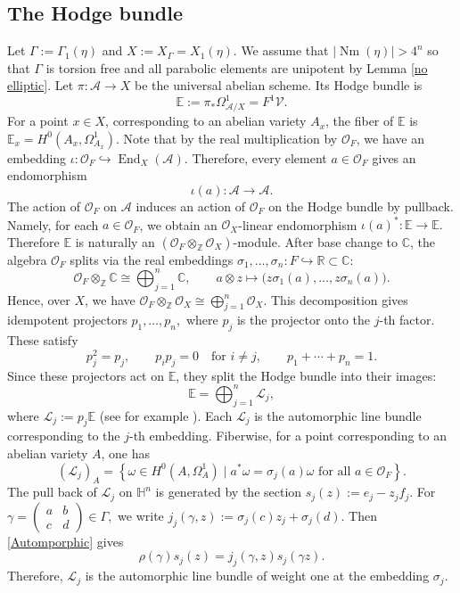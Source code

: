 \documentclass[12 pt]{amsart}
\theoremstyle{definition}
\newcommand{\Nm}{\operatorname{Nm}}
\begin{document}
\subsection{The Hodge bundle} Let $\Gamma:=\Gamma_1(\eta)$ and $X:=X_\Gamma=X_1(\eta)$. We assume that $|\Nm(\eta)|>4^n$ so that $\Gamma$ is torsion free and all parabolic elements are unipotent by Lemma \ref{no elliptic}.  Let $\pi:\mathcal A\to X$ be the universal abelian scheme. Its Hodge bundle is
\begin{equation*}
\mathbb E:=\pi_*\Omega^1_{\mathcal A/X}=F^1\mathcal V.
\end{equation*}
For a point \(x\in X\), corresponding to an abelian variety \(A_x\), the fiber
of \(\mathbb E\) is
\(
\mathbb E_x=H^0(A_x,\Omega^1_{A_x}).
\)
 Note that by the real multiplication by \(\mathcal O_F\), we have an embedding
\(
\iota:\mathcal O_F\hookrightarrow \operatorname{End}_X(\mathcal A).
\)
Therefore, every element \(a\in \mathcal O_F\) gives an endomorphism
\[
\iota(a):\mathcal A\longrightarrow \mathcal A.
\]
The action of \(\mathcal O_F\) on \(\mathcal A\) induces an action of
\(\mathcal O_F\) on the Hodge bundle by pullback. Namely, for each
\(a\in\mathcal O_F\), we obtain an \(\mathcal O_X\)-linear endomorphism
\(
\iota(a)^*:\mathbb E\longrightarrow \mathbb E.
\)
Therefore \(\mathbb E\) is naturally an
\((\mathcal O_F\otimes_{\mathbb Z}\mathcal O_X)\)-module. After base change to
\(\mathbb C\), the algebra \(\mathcal O_F\) splits via the real embeddings
\(\sigma_1,\dots,\sigma_n:F\hookrightarrow \mathbb R\subset\mathbb C\):
\[
\mathcal O_F\otimes_{\mathbb Z}\mathbb C
\cong
\bigoplus_{j=1}^n \mathbb C,
\qquad
a\otimes z\longmapsto
\bigl(z\sigma_1(a),\dots,z\sigma_n(a)\bigr).
\]
Hence, over \(X\), we have
\(
\mathcal O_F\otimes_{\mathbb Z}\mathcal O_{X}
\cong
\bigoplus_{j=1}^n \mathcal O_{X}.
\)
This decomposition gives idempotent projectors
\(
p_1,\dots,p_n,
\)
where \(p_j\) is the projector onto the \(j\)-th factor. These satisfy
\[
p_j^2=p_j,\qquad
p_i p_j=0\quad\text{for }i\neq j,\qquad
p_1+\cdots+p_n=1.
\]
Since these projectors act on \(\mathbb E\), they split the Hodge
bundle into their images:
\begin{equation*}
\mathbb E=\bigoplus_{j=1}^n\mathcal L_j,
\end{equation*}
where
\(
\mathcal L_j:=p_j\mathbb E
\)
(see for example \cite[\S 2.3]{goren2002lectures}). Each $\mathcal L_j$ is the automorphic line bundle
corresponding to the $j$-th embedding. Fiberwise, for a
point corresponding to an abelian variety $A$, one has
\begin{equation*}
(\mathcal L_j)_A
=
\left\{
\omega\in H^0(A,\Omega_A^1)
\mid
a^*\omega=\sigma_j(a)\omega
\text{ for all }a\in \mathcal O_F
\right\}.
\end{equation*}
The pull back of \(\mathcal L_j\)  on $\mathbb H^n$ is generated by the section
\(
s_j(z):=e_j-z_jf_j.
\)
For
\(
\gamma=
\begin{pmatrix}
a&b\\
c&d
\end{pmatrix}\in\Gamma,
\)
we write
\(
j_j(\gamma,z):=\sigma_j(c)z_j+\sigma_j(d).
\)
Then \eqref{Automporphic} gives
\[
\rho(\gamma)s_j(z)
=
j_j(\gamma,z)s_j(\gamma z).
\]
Therefore, $\mathcal L_j$ is the automorphic line bundle of weight one at the embedding $\sigma_j$. 
\end{document}
